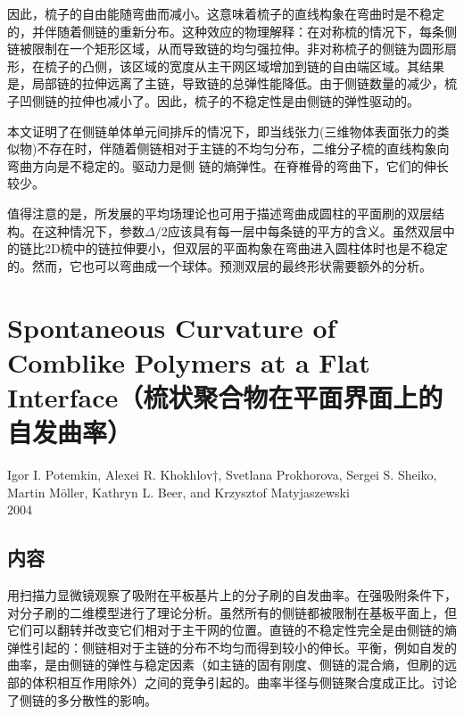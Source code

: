 \documentclass[12pt,a4paper]{article}
\numberwithin{equation}{section}
\begin{document}
因此，梳子的自由能随弯曲而减小。这意味着梳子的直线构象在弯曲时是不稳定的，并伴随着侧链的重新分布。这种效应的物理解释：在对称梳的情况下，每条侧链被限制在一个矩形区域，从而导致链的均匀强拉伸。非对称梳子的侧链为圆形扇形，在梳子的凸侧，该区域的宽度从主干网区域增加到链的自由端区域。其结果是，局部链的拉伸远离了主链，导致链的总弹性能降低。由于侧链数量的减少，梳子凹侧链的拉伸也减小了。因此，梳子的不稳定性是由侧链的弹性驱动的。

本文证明了在侧链单体单元间排斥的情况下，即当线张力(三维物体表面张力的类似物)不存在时，伴随着侧链相对于主链的不均匀分布，二维分子梳的直线构象向弯曲方向是不稳定的。驱动力是侧
链的熵弹性。在脊椎骨的弯曲下，它们的伸长较少。

值得注意的是，所发展的平均场理论也可用于描述弯曲成圆柱的平面刷的双层结构。在这种情况下，参数$\Delta/2$应该具有每一层中每条链的平方的含义。虽然双层中的链比2D梳中的链拉伸要小，但双层的平面构象在弯曲进入圆柱体时也是不稳定的。然而，它也可以弯曲成一个球体。预测双层的最终形状需要额外的分析。


\section{Spontaneous Curvature of Comblike Polymers at a Flat Interface（梳状聚合物在平面界面上的自发曲率）}
\begin{center}
Igor I. Potemkin, Alexei R. Khokhlov†, Svetlana Prokhorova, Sergei S. Sheiko, Martin Möller, Kathryn L. Beer, and Krzysztof Matyjaszewski \\
2004
\end{center}
\subsection{内容}
用扫描力显微镜观察了吸附在平板基片上的分子刷的自发曲率。在强吸附条件下，对分子刷的二维模型进行了理论分析。虽然所有的侧链都被限制在基板平面上，但它们可以翻转并改变它们相对于主干网的位置。直链的不稳定性完全是由侧链的熵弹性引起的：侧链相对于主链的分布不均匀而得到较小的伸长。平衡，例如自发的曲率，是由侧链的弹性与稳定因素（如主链的固有刚度、侧链的混合熵，但刷的远部的体积相互作用除外）之间的竞争引起的。曲率半径与侧链聚合度成正比。讨论了侧链的多分散性的影响。
\end{document}
